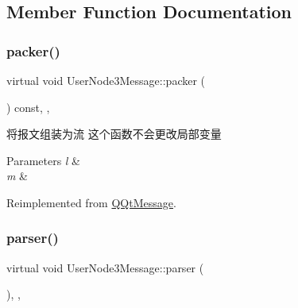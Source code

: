 \subsection{Member Function Documentation}
\mbox{\label{class_user_node3_message_a57755b35ef30f7e97a112c4747277d4a}} 
\subsubsection{\texorpdfstring{packer()}{packer()}}
{\footnotesize\ttfamily virtual void User\+Node3\+Message\+::packer (\begin{DoxyParamCaption}\item[{Q\+Byte\+Array \&}]{ }\end{DoxyParamCaption}) const\hspace{0.3cm}{\ttfamily [inline]}, {\ttfamily [override]}, {\ttfamily [virtual]}}



将报文组装为流 这个函数不会更改局部变量 


\begin{DoxyParams}{Parameters}
{\em l} & \\
\hline
{\em m} & \\
\hline
\end{DoxyParams}


Reimplemented from \mbox{\hyperlink{class_q_qt_message_af1885c2c3628495808dca66ee8d72e14}{Q\+Qt\+Message}}.

\mbox{\label{class_user_node3_message_a5b5f3ff430543061048b9634079287d5}} 
\subsubsection{\texorpdfstring{parser()}{parser()}}
{\footnotesize\ttfamily virtual void User\+Node3\+Message\+::parser (\begin{DoxyParamCaption}\item[{const Q\+Byte\+Array \&}]{ }\end{DoxyParamCaption})\hspace{0.3cm}{\ttfamily [inline]}, {\ttfamily [override]}, {\ttfamily [virtual]}}



